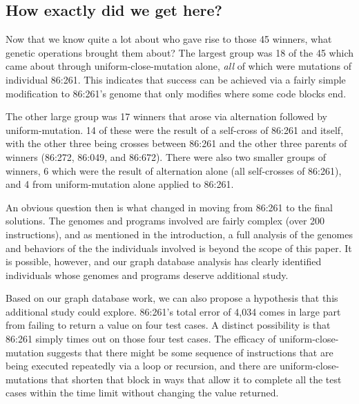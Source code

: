 \subsection{How exactly did we get here?}
\label{sec:howDidWeGetHere}

Now that we know quite a lot about who gave rise to those 45 winners, what genetic operations
brought them about? The largest group was 18 of the 45 which came about through 
uniform-close-mutation alone, \emph{all} of which were mutations of individual 86:261. This indicates
that success can be achieved via a fairly simple modification to 86:261's genome that only modifies 
where some code blocks end.

The other large group was 17 winners that arose via alternation followed by uniform-mutation. 14 of
these were the result of a self-cross of 86:261 and itself, with the other three being crosses between
86:261 and the other three parents of winners (86:272, 86:049, and 86:672). There were also two smaller
groups of winners, 6 which were the result of alternation alone (all self-crosses of 86:261), and 4
from uniform-mutation alone applied to 86:261.

An obvious question then is what changed in moving from 86:261 to the final solutions. The genomes and
programs involved are fairly complex (over 200 instructions), and as mentioned in
the introduction, a full analysis of the genomes and behaviors of the the individuals involved is 
beyond the scope of this paper. It is possible, however, and our graph database analysis has clearly
identified individuals whose genomes and programs deserve additional study. 

Based on our graph database work, we can also propose a hypothesis that this additional study could
explore. 86:261's total error of 4,034 comes in large part from failing to return a value on four 
test cases. A distinct possibility is that 86:261 simply times out on those
four test cases. The efficacy of uniform-close-mutation suggests that there might be some sequence of 
instructions that are being executed repeatedly via a loop or recursion, and there are 
uniform-close-mutations that shorten that block in ways that allow it to complete all the test
cases within the time limit without changing the value returned.

